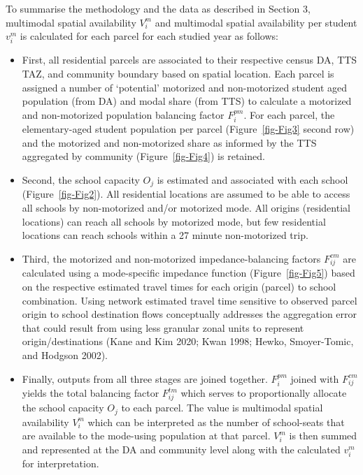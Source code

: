 \documentclass[
default
]{sn-jnl}
\providecommand{\tightlist}{%
  \setlength{\itemsep}{0pt}\setlength{\parskip}{0pt}}\usepackage{longtable,booktabs,array}
\begin{document}
To summarise the methodology and the data as described in Section 3,
multimodal spatial availability \(V_i^m\) and multimodal spatial
availability per student \(v_i^m\) is calculated for each parcel for
each studied year as follows:

\begin{itemize}
\tightlist
\item
  First, all residential parcels are associated to their respective
  census DA, TTS TAZ, and community boundary based on spatial location.
  Each parcel is assigned a number of `potential' motorized and
  non-motorized student aged population (from DA) and modal share (from
  TTS) to calculate a motorized and non-motorized population balancing
  factor \(F_{i}^{pm}\). For each parcel, the elementary-aged student
  population per parcel (Figure~\ref{fig-Fig3} second row) and the
  motorized and non-motorized share as informed by the TTS aggregated by
  community (Figure~\ref{fig-Fig4}) is retained.
\item
  Second, the school capacity \(O_j\) is estimated and associated with
  each school (Figure~\ref{fig-Fig2}). All residential locations are
  assumed to be able to access all schools by non-motorized and/or
  motorized mode. All origins (residential locations) can reach all
  schools by motorized mode, but few residential locations can reach
  schools within a 27 minute non-motorized trip.
\item
  Third, the motorized and non-motorized impedance-balancing factors
  \(F_{ij}^{cm}\) are calculated using a mode-specific impedance
  function (Figure~\ref{fig-Fig5}) based on the respective estimated
  travel times for each origin (parcel) to school combination. Using
  network estimated travel time sensitive to observed parcel origin to
  school destination flows conceptually addresses the aggregation error
  that could result from using less granular zonal units to represent
  origin/destinations (Kane and Kim 2020; Kwan 1998; Hewko,
  Smoyer-Tomic, and Hodgson 2002).
\item
  Finally, outputs from all three stages are joined together.
  \(F_{i}^{pm}\) joined with \(F_{ij}^{cm}\) yields the total balancing
  factor \(F^{tm}_{ij}\) which serves to proportionally allocate the
  school capacity \(O_j\) to each parcel. The value is multimodal
  spatial availability \(V_i^m\) which can be interpreted as the number
  of school-seats that are available to the mode-using population at
  that parcel. \(V_i^m\) is then summed and represented at the DA and
  community level along with the calculated \(v_i^m\) for
  interpretation.
\end{itemize}
\end{document}
